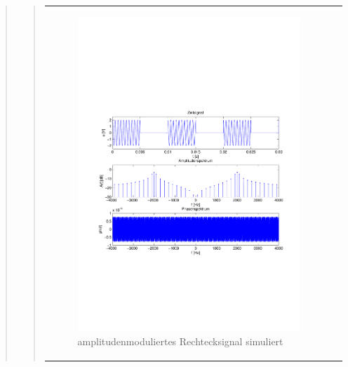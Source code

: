 \begin{quote}
\begin{quote}
\begin{center}
\begin{tabular}{ll}
            \hspace{-10em}
                \begin{minipage}{0.6\textwidth}

                    \begin{figure}[H]
                        \label{fig:}
                        \includegraphics[scale=0.5, trim = 2cm 6.5cm 1.5cm
                        8.5cm, clip]{./Bilder/Rechteckmodsimuliert} %
                        \caption{amplitudenmoduliertes Rechtecksignal simuliert}
                    \end{figure}

                \end{minipage}
                \begin{minipage}{0.6\textwidth}


\end{minipage}
\end{tabular}
\end{center}
\end{quote}
\end{quote}
